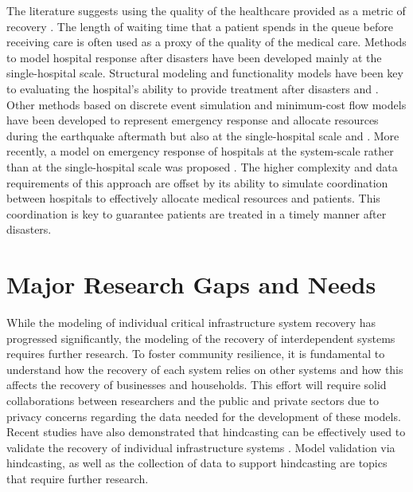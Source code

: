 The literature suggests using the quality of the healthcare provided as a metric of recovery \citep{vieth2006effect, hamby2004using}. The length of waiting time that a patient spends in the queue before receiving care is often used as a proxy of the quality of the medical care. Methods to model hospital response after disasters have been developed mainly at the single-hospital scale. Structural modeling and functionality models have been key to evaluating the hospital's ability to provide treatment after disasters \citep{yavari2010modeling,  cimellaro2011performance} and \citep{jacques2014resilience}. Other methods based on discrete event simulation and minimum-cost flow models have been developed to represent emergency response and allocate resources during the earthquake aftermath but also at the single-hospital scale \citep{yi2005real,gul2015comprehensive,vugrin2015modeling} and  \citep{aghapour2019capacity}. More recently, a model on emergency response of hospitals at the system-scale rather than at the single-hospital scale was proposed \citep{ceferino2019effective}. The higher complexity and data requirements of this approach are offset by its ability to simulate coordination between hospitals to effectively allocate medical resources and patients. This coordination is key to guarantee patients are treated in a timely manner after disasters.\

\section{Major Research Gaps and Needs}
While the modeling of individual critical infrastructure system recovery has progressed significantly, the modeling of the recovery of interdependent systems requires further research. To foster community resilience, it is fundamental to understand how the recovery of each system relies on other systems and how this affects the recovery of businesses and households. This effort will require solid collaborations between researchers and the public and private sectors due to privacy concerns regarding the data needed for the development of these models. Recent studies have also demonstrated that hindcasting can be effectively used to validate the recovery of individual infrastructure systems \citep{tomar2020hindcasting}. Model validation via hindcasting, as well as the collection of data to support hindcasting are topics that require further research. \

\FloatBarrier